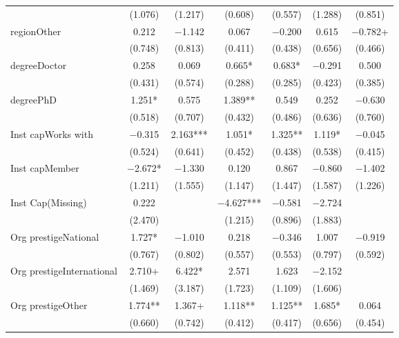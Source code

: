 \begin{table}
\begin{tabular}[t]{lcccccc}
 & (\num{1.076}) & (\num{1.217}) & (\num{0.608}) & (\num{0.557}) & (\num{1.288}) & (\num{0.851})\\
regionOther & \num{0.212} & \num{-1.142} & \num{0.067} & \num{-0.200} & \num{0.615} & \num{-0.782}+\\
 & (\num{0.748}) & (\num{0.813}) & (\num{0.411}) & (\num{0.438}) & (\num{0.656}) & (\num{0.466})\\
degreeDoctor & \num{0.258} & \num{0.069} & \num{0.665}* & \num{0.683}* & \num{-0.291} & \num{0.500}\\
 & (\num{0.431}) & (\num{0.574}) & (\num{0.288}) & (\num{0.285}) & (\num{0.423}) & (\num{0.385})\\
degreePhD & \num{1.251}* & \num{0.575} & \num{1.389}** & \num{0.549} & \num{0.252} & \num{-0.630}\\
 & (\num{0.518}) & (\num{0.707}) & (\num{0.432}) & (\num{0.486}) & (\num{0.636}) & (\num{0.760})\\
Inst capWorks with & \num{-0.315} & \num{2.163}*** & \num{1.051}* & \num{1.325}** & \num{1.119}* & \num{-0.045}\\
 & (\num{0.524}) & (\num{0.641}) & (\num{0.452}) & (\num{0.438}) & (\num{0.538}) & (\num{0.415})\\
Inst capMember & \num{-2.672}* & \num{-1.330} & \num{0.120} & \num{0.867} & \num{-0.860} & \num{-1.402}\\
 & (\num{1.211}) & (\num{1.555}) & (\num{1.147}) & (\num{1.447}) & (\num{1.587}) & (\num{1.226})\\
Inst Cap(Missing) & \num{0.222} &  & \num{-4.627}*** & \num{-0.581} & \num{-2.724} & \\
 & (\num{2.470}) &  & (\num{1.215}) & (\num{0.896}) & (\num{1.883}) & \\
Org prestigeNational & \num{1.727}* & \num{-1.010} & \num{0.218} & \num{-0.346} & \num{1.007} & \num{-0.919}\\
 & (\num{0.767}) & (\num{0.802}) & (\num{0.557}) & (\num{0.553}) & (\num{0.797}) & (\num{0.592})\\
Org prestigeInternational & \num{2.710}+ & \num{6.422}* & \num{2.571} & \num{1.623} & \num{-2.152} & \\
 & (\num{1.469}) & (\num{3.187}) & (\num{1.723}) & (\num{1.109}) & (\num{1.606}) & \\
Org prestigeOther & \num{1.774}** & \num{1.367}+ & \num{1.118}** & \num{1.125}** & \num{1.685}* & \num{0.064}\\
 & (\num{0.660}) & (\num{0.742}) & (\num{0.412}) & (\num{0.417}) & (\num{0.656}) & (\num{0.454})\\

\end{tabular}
\end{table}
